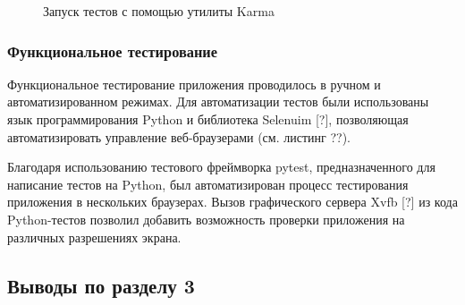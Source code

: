 \begin{figure}[h!]
  \centering
  \setlength{\fboxsep}{5pt}
  \vspace*{6pt}
  \caption{Запуск тестов с помощью утилиты Karma}
  \label{fig:karma-output}
\end{figure}


\subsubsection{Функциональное тестирование}

Функциональное тестирование приложения проводилось в ручном и автоматизированном режимах. Для автоматизации тестов были использованы язык программирования Python и библиотека Selenuim [?], позволяющая автоматизировать управление веб-браузерами (см. листинг ??).

Благодаря использованию тестового фреймворка pytest, предназначенного для написание тестов на Python, был автоматизирован процесс тестирования приложения в нескольких браузерах. Вызов графического сервера Xvfb [?] из кода Python-тестов позволил добавить возможность проверки приложения на различных разрешениях экрана.

{\color{gray}{*listing*}}



\subsection{Выводы по разделу 3}

